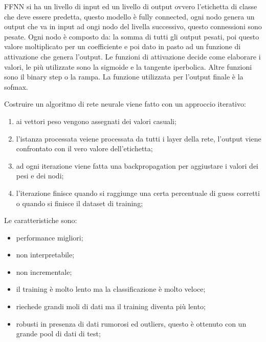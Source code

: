 \documentclass[12pt]{article}
\begin{document}
FFNN si ha un livello di input ed un livello di output ovvero l'etichetta di classe che deve essere predetta, questo modello \`e fully connected, ogni nodo genera un output che va in input ad ongi nodo del livella successivo, questo connessioni sono pesate. Ogni nodo \`e composto da: la somma di tutti gli output pesati, poi questo valore moltiplicato per un coefficiente e poi dato in pasto ad un funzione di attivazione che genera l'output. Le funzioni di attivazione decide come elaborare i valori, le pi\`u utilizzate sono la sigmoide e la tangente iperbolica. Altre funzioni sono il binary step o la rampa. La funzione utilizzata per l'output finale \`e la sofmax. 

Costruire un algoritmo di rete neurale viene fatto con un approccio iterativo:
\begin{enumerate}
    \item ai vettori peso vengono assegnati dei valori casuali;
    \item l'istanza processata veiene processata da tutti i layer della rete, l'output viene confrontato con il vero valore dell'etichetta;
    \item ad ogni iterazione viene fatta una backpropagation per aggiustare i valori dei pesi e dei nodi;
    \item l'iterazione finisce quando si raggiunge una certa percentuale di guess corretti o quando si finisce il dataset di training;
\end{enumerate}

Le caratteristiche sono:
\begin{itemize}
    \item performance migliori;
    \item non interpretabile;
    \item non incrementale;
    \item il training \`e molto lento ma la classificazione \`e molto veloce;
    \item riechede grandi moli di dati ma il training diventa pi\`u lento;
    \item robusti in presenza di dati rumorosi ed outliers, questo \`e ottenuto con un grande pool di dati di test;
\end{itemize}
\end{document}
